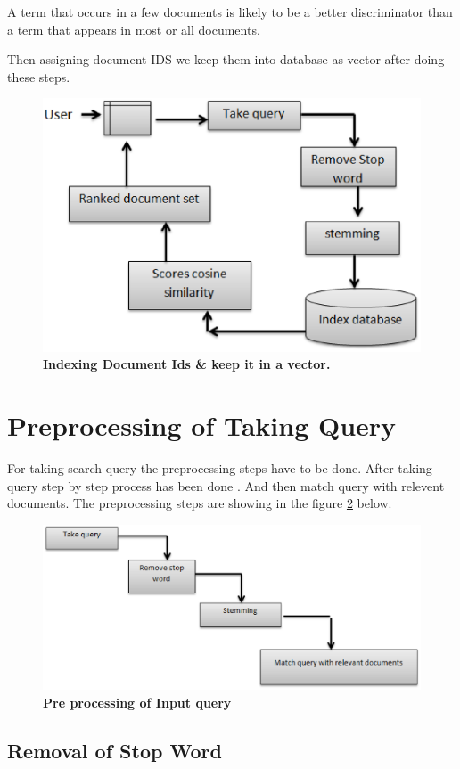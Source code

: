 A term that occurs in a few documents is likely to be a better discriminator than a term that appears in most or all documents.

Then assigning document IDS we keep them into database as vector after doing these steps.


\begin{figure}[htp]
	\centering
		\includegraphics[width=.65\textwidth]{figure/two.eps}
	\caption{\textbf{Indexing Document Ids \& keep it in a vector.}}
	\label{Figure:indexing}
\end{figure}


\section{Preprocessing of Taking Query}

For taking search query the preprocessing steps have to be done. After taking query step by step process has been done . And then match query with relevent documents. The preprocessing steps are showing in the figure \ref{Figure:inquery} below.


\begin{figure}[htp]
	\centering
		\includegraphics[width=.65\textwidth]{figure/three.eps}
	\caption{\textbf{Pre processing of Input query}}
	\label{Figure:inquery}
\end{figure}


\subsection{Removal of Stop Word}

